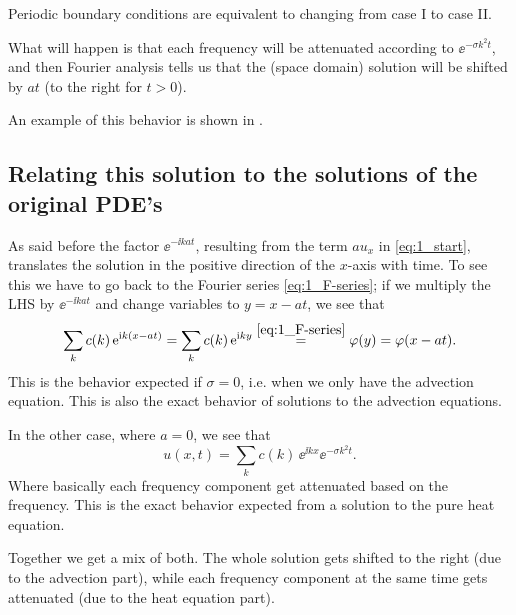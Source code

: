 \documentclass[11pt,letter, swedish, english
]{article}
\begin{document}
Periodic boundary conditions are equivalent to changing from case I to
case II. 

What will happen is that each frequency will be attenuated according
to $\ee^{-\sigma k^2t}$, and then Fourier analysis tells us that the
(space domain) solution will be shifted\footnotemark{} by $at$ (to
the right for $t>0$). 


An example of this behavior is shown in .

\subsection{Relating this solution to the solutions of the original PDE's}
As said before the factor $\ee^{-\ii kat}$, resulting from the term
$au_x$ in \eqref{eq:1_start}, translates the solution in the positive
direction of the $x$-axis with time. To see this we have to go back to
the Fourier series \eqref{eq:1_F-series}; if we multiply the LHS by
$\ee^{-\ii kat}$ and change variables to $y=x-at$, we see that
\begin{equation}
\sum_k c(k)\, \mathrm{e}^{\mathrm{i} k(x-at)}=\sum_k c(k)\, \mathrm{e}^{\mathrm{i} ky}
\stackrel{\eqref{eq:1_F-series}}{=}\varphi(y)=\varphi(x-at).
\end{equation}
This is the behavior expected if $\sigma=0$, i.e. when we only have
the advection equation. This is also the exact behavior of solutions
to the advection equations. 

In the other case, where $a=0$, we see that 
\begin{equation}
u(x, t) = \sum_k c(k)\, \ee^{\ii kx}\ee^{-\sigma k^2t}.
\end{equation}
Where basically each frequency component get attenuated based on the
frequency. This is the exact behavior expected from a solution to the
pure heat equation. 

Together we get a mix of both. The whole solution gets shifted to the
right (due to the advection part), while each frequency component at
the same time gets attenuated (due to the heat equation part). 
\end{document}
